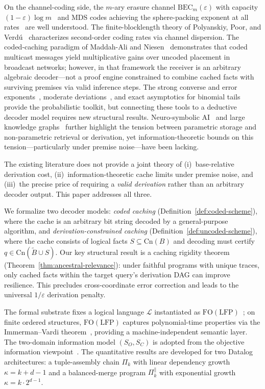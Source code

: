 \documentclass[journal]{IEEEtran}
\newcommand{\Cn}{\text{Cn}}
\numberwithin{equation}{section}
\begin{document}
On the channel-coding side, the $m$-ary erasure channel
$\mathrm{BEC}_m(\varepsilon)$ with capacity
$(1{-}\varepsilon)\log m$~\cite{cover2006elements} and MDS codes achieving the
sphere-packing exponent at all
rates~\cite[Theorem~5.8.3]{gallager1968information} are well understood.
The finite-blocklength theory of Polyanskiy, Poor, and
Verd\'{u}~\cite{polyanskiy2010channel} characterizes second-order coding rates via
channel dispersion.
The coded-caching paradigm of Maddah-Ali and
Niesen~\cite{maddah2014fundamental} demonstrates that coded multicast messages
yield multiplicative gains over uncoded placement in broadcast networks; however,
in that framework the receiver is an arbitrary algebraic decoder---not a proof
engine constrained to combine cached facts with surviving premises via valid
inference steps.
The strong converse and error
exponents~\cite{bahadur1960deviations,dembo2009large,gallager1968information},
moderate deviations~\cite{dembo2009large}, and exact asymptotics for binomial tails
provide the probabilistic toolkit, but connecting these tools to a deductive
decoder model requires new structural results.
Neuro-symbolic AI~\cite{garcez2023neurosymbolic} and large knowledge
graphs~\cite{bollacker2008freebase} further highlight the tension between
parametric storage and non-parametric retrieval or derivation, yet
information-theoretic bounds on this tension---particularly under premise
noise---have been lacking.

The existing literature does not provide a joint theory of (i)~base-relative
derivation cost, (ii)~information-theoretic cache limits under premise noise,
and (iii)~the precise price of requiring a \emph{valid derivation} rather than an
arbitrary decoder output. This paper addresses all three.

We formalize two decoder models: \emph{coded caching}
(Definition~\ref{def:coded-scheme}), where the cache is an arbitrary bit string
decoded by a general-purpose algorithm, and \emph{derivation-constrained caching}
(Definition~\ref{def:uncoded-scheme}), where the cache consists of logical facts
\(S\subseteq\Cn(B)\) and decoding must certify \(q\in\Cn(\tilde B\cup S)\).
Our key structural result is a caching rigidity theorem
(Theorem~\ref{thm:ancestral-relevance}): under faithful programs with unique
traces, only cached facts within the target query's derivation DAG can improve
resilience. This precludes cross-coordinate error correction and leads to the
universal \(1/\varepsilon\) derivation penalty.

The formal substrate fixes a logical language $\mathcal{L}$ instantiated as
$\mathrm{FO(LFP)}$~\cite{immerman1999descriptive}; on finite ordered structures,
$\mathrm{FO(LFP)}$ captures polynomial-time properties via the Immerman--Vardi
theorem~\cite{immerman1982relational,vardi1982complexity}, providing a
machine-independent semantic layer.
The two-domain information model $(S_O,S_C)$ is adopted from the objective
information viewpoint~\cite{xu2014objective,xu2024research,xu2025general,qiu2025research}.
The quantitative results are developed for two Datalog architectures: a
tuple-assembly chain $\Pi_k$ with linear dependency growth
$\kappa=k{+}d{-}1$ and a balanced-merge program $\Pi_k^{\parallel}$ with
exponential growth $\kappa=k\cdot 2^{d-1}$.
\end{document}
